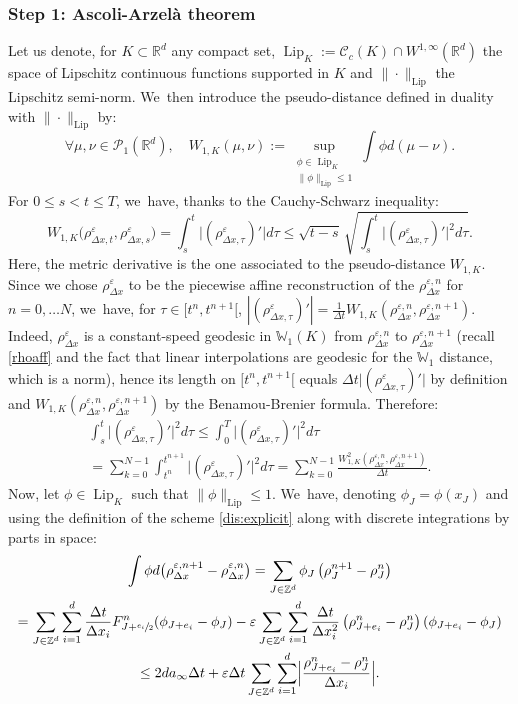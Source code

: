 \documentclass[JEP,XML,SOM,Unicode, NoFloatCountersInSection,published]{cedram}
\DeclareMathOperator{\Lip}{Lip}
\def\RR{\mathbb{R}}
\def\ZZ{\mathbb{Z}}
\def\WW{\mathbb{W}}
\def\eps{\varepsilon}
\def\lip{\mathrm{Lip}}
\def\dt{\Delta t}
\def\dx{\Delta x}
\def\calC{{\mathcal C}}
\def\calP{{\mathcal P}}
\theoremstyle{plain}
\theoremstyle{definition}
\begin{document}
\subsubsection*{Step 1: Ascoli-Arzelà theorem} Let us denote, for $K \subset \RR^d$ any compact set, $\Lip_K := \calC_c(K) \cap W^{1,\infty}(\RR^d)$ the space of Lipschitz continuous functions supported in $K$ and $\|\cdot\|_{\lip}$ the Lipschitz semi-norm. We~then introduce the pseudo-distance defined in duality with $\|{\cdot}\|_{\lip}$ by:
\[
\forall \mu, \nu \in \calP_1(\RR^d), \quad W_{1,K}(\mu, \nu) := \sup_{\substack{\phi \in \Lip_K\\ \|\phi\|_{\lip} \leq 1}} \int \phi d(\mu-\nu).
\]
For $0\leq s < t \leq T$, we~have, thanks to the Cauchy-Schwarz inequality:
\begin{equation}\label{ineq:HolderW1K}
W_{1,K}\big(\rho_{\dx,t}^\eps, \rho_{\dx,s}^\eps\big) = \int_s^t \big|(\rho_{\dx, \tau}^\eps)'\big| d\tau \leq \sqrt{t-s} \, \sqrt{\int_s^t \big|(\rho_{\dx,\tau}^\eps)'\big|^2 d\tau}.
\end{equation}
Here, the metric derivative is the one associated to the pseudo-distance $W_{1,K}$. Since we chose $\rho_{\dx}^\eps$ to be the piecewise affine reconstruction of the $\rho_{\dx}^{\eps,n}$ for $n=0, \ldots N$, we~have, for $\tau \in [t^n, t^{n+1}[$, $ |(\rho_{\dx,\tau}^\eps)'| = \frac{1}{\dt} W_{1,K}(\rho_{\dx}^{\eps,n}, \rho_{\dx}^{\eps,n+1})$. Indeed, $\rho_{\dx}^\eps$ is a constant-speed geodesic in $\WW_1(K)$ from $\rho_{\dx}^{\eps,n}$ to $\rho_{\dx}^{\eps,n+1}$ (recall \eqref{rhoaff} and the fact that linear interpolations are geodesic for the $\WW_1$ distance, which is a norm), hence its length on $[t^n, t^{n+1}[$ equals $\dt\big|(\rho_{\dx,\tau}^\eps)'\big|$ by definition and $W_{1,K}(\rho_{\dx}^{\eps,n}, \rho_{\dx}^{\eps,n+1})$ by the Benamou-Brenier formula. Therefore:
\begin{multline}\label{eq:pff}
\int_s^t \big|(\rho_{\dx,\tau}^\eps)'\big|^2 d\tau \leq \int_0^T \big|(\rho_{\dx,\tau}^\eps)'\big|^2 d\tau \\
= \sum_{k=0}^{N-1} \int_{t^n}^{t^{n+1}} \big|(\rho_{\dx,\tau}^\eps)'\big|^2 d\tau = \sum_{k=0}^{N-1} \frac{W_{1,K}^2(\rho_{\dx}^{\eps,n}, \rho_{\dx}^{\eps,n+1})}{\dt}.
\end{multline}
Now, let $\phi \in \Lip_K$ such that $\|\phi\|_{\lip} \leq 1$. We~have, denoting $\phi_J = \phi(x_J)$ and using the definition of the scheme \eqref{dis:explicit} along with discrete integrations by parts in space:
\begin{multline*}
\int \phi d\big(\rho_{\dx}^{\eps,n+1}-\rho_{\dx}^{\eps,n}\big) = \sum_{J\in\ZZ^d} \phi_J \left(\rho_J^{n+1} - \rho_J^{n}\right) \\
= \sum_{J \in \ZZ^d} \sum_{i=1}^{d} \frac{\dt}{\dx_i}
F_{J+ \sfrac{e_i}{2}}^{n}(\phi_{J+e_i} - \phi_J) - \eps \sum_{J \in \ZZ^d} \sum_{i=1}^{d} \frac{\dt}{\dx_i^2} \left(\rho_{J+e_i}^{n} - \rho_J^{n}\right)(\phi_{J+e_i} - \phi_J) \\
\leq 2da_\infty \dt + \eps \dt \sum_{J \in \ZZ^d} \sum_{i=1}^{d} \Bigl|\frac{\rho_{J+e_i}^{n} - \rho_J^{n}}{\dx_i}\Bigr|.
\end{multline*}
\end{document}
